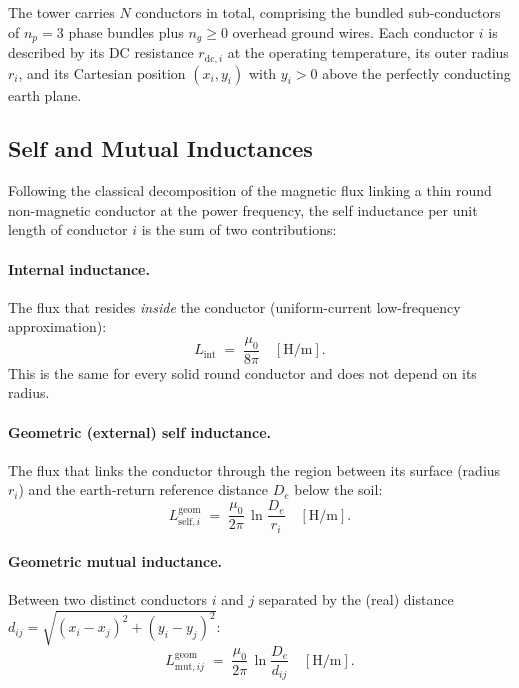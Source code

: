 \documentclass[11pt,a4paper]{article}
\newcommand{\Lint}{L_{\mathrm{int}}}
\newcommand{\Lself}[1]{L^{\mathrm{geom}}_{\mathrm{self},#1}}
\newcommand{\Lmut}[1]{L^{\mathrm{geom}}_{\mathrm{mut},#1}}
\begin{document}
The tower carries \(N\) conductors in total, comprising the bundled
sub-conductors of \(n_p=3\) phase bundles plus \(n_g\ge 0\) overhead ground
wires. Each conductor \(i\) is described by its DC resistance
\(r_{\mathrm{dc},i}\) at the operating temperature, its outer radius \(r_i\),
and its Cartesian position \((x_i,y_i)\) with \(y_i>0\) above the perfectly
conducting earth plane.

\subsection{Self and Mutual Inductances}

Following the classical decomposition of the magnetic flux linking a thin
round non-magnetic conductor at the power frequency, the self inductance per
unit length of conductor \(i\) is the sum of two contributions:

\paragraph{Internal inductance.} The flux that resides \emph{inside} the
conductor (uniform-current low-frequency approximation):
\begin{equation}
\Lint \;=\; \frac{\mu_{0}}{8\pi}\quad[\si{\henry/\metre}].
\label{eq:Lint}
\end{equation}
This is the same for every solid round conductor and does not depend on its
radius.

\paragraph{Geometric (external) self inductance.} The flux that links the
conductor through the region between its surface (radius \(r_i\)) and the
earth-return reference distance \(D_e\) below the soil:
\begin{equation}
\Lself{i}\;=\;\frac{\mu_{0}}{2\pi}\,\ln\!\frac{D_{e}}{r_{i}}
\quad[\si{\henry/\metre}].
\label{eq:Lselfgeom}
\end{equation}

\paragraph{Geometric mutual inductance.} Between two distinct conductors
\(i\) and \(j\) separated by the (real) distance
\(d_{ij}=\sqrt{(x_{i}-x_{j})^{2}+(y_{i}-y_{j})^{2}}\):
\begin{equation}
\Lmut{ij}\;=\;\frac{\mu_{0}}{2\pi}\,\ln\!\frac{D_{e}}{d_{ij}}
\quad[\si{\henry/\metre}].
\label{eq:Lmut}
\end{equation}
\end{document}
